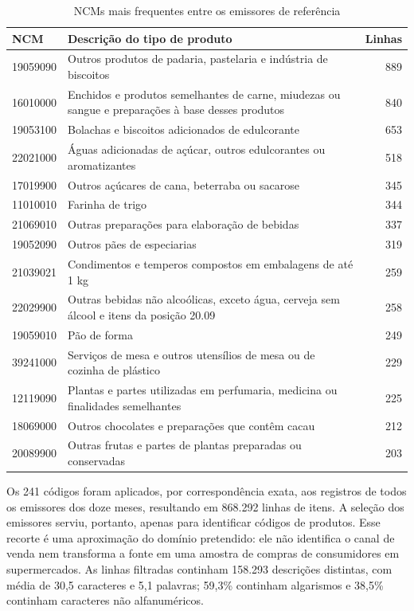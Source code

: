 \documentclass[english,brazilian]{UNISINOSmonografia}
\begin{document}
\begin{table}[!htb]
    \caption{NCMs mais frequentes entre os emissores de referência}
    \label{tab:ncm}
    \centering
    \small
    \begin{tabularx}{\textwidth}{lXr}
        \hline
        \textbf{NCM} & \textbf{Descrição do tipo de produto} & \textbf{Linhas}\\
        \hline
        19059090 & Outros produtos de padaria, pastelaria e indústria de biscoitos & 889\\
        16010000 & Enchidos e produtos semelhantes de carne, miudezas ou sangue e preparações à base desses produtos & 840\\
        19053100 & Bolachas e biscoitos adicionados de edulcorante & 653\\
        22021000 & Águas adicionadas de açúcar, outros edulcorantes ou aromatizantes & 518\\
        17019900 & Outros açúcares de cana, beterraba ou sacarose & 345\\
        11010010 & Farinha de trigo & 344\\
        21069010 & Outras preparações para elaboração de bebidas & 337\\
        19052090 & Outros pães de especiarias & 319\\
        21039021 & Condimentos e temperos compostos em embalagens de até 1 kg & 259\\
        22029900 & Outras bebidas não alcoólicas, exceto água, cerveja sem álcool e itens da posição 20.09 & 258\\
        19059010 & Pão de forma & 249\\
        39241000 & Serviços de mesa e outros utensílios de mesa ou de cozinha de plástico & 229\\
        12119090 & Plantas e partes utilizadas em perfumaria, medicina ou finalidades semelhantes & 225\\
        18069000 & Outros chocolates e preparações que contêm cacau & 212\\
        20089900 & Outras frutas e partes de plantas preparadas ou conservadas & 203\\
        \hline
    \end{tabularx}
\end{table}

Os 241 códigos foram aplicados, por correspondência exata, aos registros de todos os emissores dos doze meses, resultando em 868.292 linhas de itens. A seleção dos emissores serviu, portanto, apenas para identificar códigos de produtos. Esse recorte é uma aproximação do domínio pretendido: ele não identifica o canal de venda nem transforma a fonte em uma amostra de compras de consumidores em supermercados. As linhas filtradas continham 158.293 descrições distintas, com média de 30,5 caracteres e 5,1 palavras; 59,3\% continham algarismos e 38,5\% continham caracteres não alfanuméricos.
\end{document}
